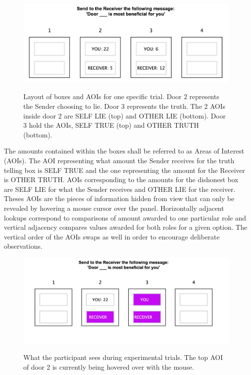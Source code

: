\documentclass[man, floatsintext]{apa7}
\begin{document}
\begin{figure}[H]
	\centering
	\includegraphics[width=0.75\linewidth]{figures/NOT HIDDEN.png}
	\label{fig:AOIs}
	\caption{Layout of boxes and AOIs for one specific trial. Door 2 represents the Sender choosing to lie. Door 3 represents the truth. The 2 AOIs inside door 2 are SELF LIE (top) and OTHER LIE (bottom). Door 3 hold the AOIs, SELF TRUE (top) and OTHER TRUTH (bottom).}
\end{figure}


The amounts contained within the boxes shall be referred to as Areas of Interest (AOIs). The AOI representing what amount the Sender receives for the truth telling box is SELF TRUE and the one representing the amount for the Receiver is OTHER TRUTH. AOIs corresponding to the amounts for the dishonest box are SELF LIE for what the Sender receives and OTHER LIE for the receiver. Theses AOIs are the pieces of information hidden from view that can only be revealed by hovering a mouse cursor over the panel. Horizontally adjacent lookups correspond to comparisons of amount awarded to one particular role and vertical adjacency compares values awarded for both roles for a given option. The vertical order of the AOIs swaps as well in order to encourage deliberate observations.

\begin{figure}[H]
	\centering
	\includegraphics[width=0.75\linewidth]{figures/HIDDEN.png}
	\label{fig:HiddenAOIs}
	\caption{What the participant sees during experimental trials. The top AOI of door 2 is currently being hovered over with the mouse.}
\end{figure}
\end{document}

